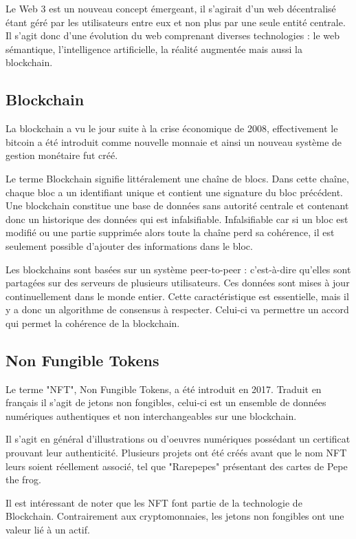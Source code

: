 \documentclass[a4paper,11pt]{article}
\begin{document}
Le Web 3 est un nouveau concept émergeant, il s'agirait d'un web décentralisé étant géré par les utilisateurs entre eux et non plus par une seule entité centrale. Il s'agit donc d'une évolution du web comprenant diverses technologies : le web sémantique, l'intelligence artificielle, la réalité augmentée mais aussi la blockchain. 

\subsection{Blockchain} %
La blockchain a vu le jour suite à la crise économique de 2008, effectivement le bitcoin a été introduit comme nouvelle monnaie et ainsi un nouveau système de gestion monétaire fut créé. 

Le terme Blockchain signifie littéralement une chaîne de blocs. Dans cette chaîne, chaque bloc a un identifiant unique et contient une signature du bloc précédent. Une blockchain constitue une base de données sans autorité centrale et contenant donc un historique des données qui est infalsifiable. 
Infalsifiable car si un bloc est modifié ou une partie supprimée alors toute la chaîne perd sa cohérence, il est seulement possible d'ajouter des informations dans le bloc. 

Les blockchains sont basées sur un système peer-to-peer : c'est-à-dire qu'elles sont partagées sur des serveurs de plusieurs utilisateurs. Ces données sont mises à jour continuellement dans le monde entier. Cette caractéristique est essentielle, mais il y a donc un algorithme de consensus à respecter. Celui-ci va permettre un accord qui permet la cohérence de la blockchain.

\subsection{Non Fungible Tokens} %
Le terme "NFT", Non Fungible Tokens, a été introduit en 2017. Traduit en français il s'agit de jetons non fongibles, celui-ci est un ensemble de données numériques authentiques et non interchangeables sur une blockchain.  

Il s'agit en général d'illustrations ou d'oeuvres numériques possédant un certificat prouvant leur authenticité. Plusieurs projets ont été créés avant que le nom NFT leurs soient réellement associé, tel que "Rarepepes" présentant des cartes de Pepe the frog.  

Il est intéressant de noter que les NFT font partie de la technologie de Blockchain. Contrairement aux cryptomonnaies, les jetons non fongibles ont une valeur lié à un actif.  
\end{document}

